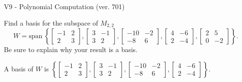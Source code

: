 \begin{exercise}
  \begin{exerciseTitle}V9 - Polynomial Computation (ver. 701)\end{exerciseTitle}
  \begin{exerciseStatement}
    Find a basis for the subspace of \(M_{2,2}\) 
\[W=\mathrm{span}\ \left\{\left[\begin{array}{cc}
-1 & 2 \\
2 & 3
\end{array}\right] , \left[\begin{array}{cc}
3 & -1 \\
3 & 2
\end{array}\right] , \left[\begin{array}{cc}
-10 & -2 \\
-8 & 6
\end{array}\right] , \left[\begin{array}{cc}
4 & -6 \\
2 & -4
\end{array}\right] , \left[\begin{array}{cc}
2 & 5 \\
0 & -2
\end{array}\right]\right\}.\]
 Be sure to explain why your result is a basis.


  \end{exerciseStatement}
  \begin{exerciseAnswer}
   A basis of \(W\) is  \(\left\{\left[\begin{array}{cc}
-1 & 2 \\
2 & 3
\end{array}\right] , \left[\begin{array}{cc}
3 & -1 \\
3 & 2
\end{array}\right] , \left[\begin{array}{cc}
-10 & -2 \\
-8 & 6
\end{array}\right] , \left[\begin{array}{cc}
4 & -6 \\
2 & -4
\end{array}\right]\right\}\).
  


  \end{exerciseAnswer}
\end{exercise}